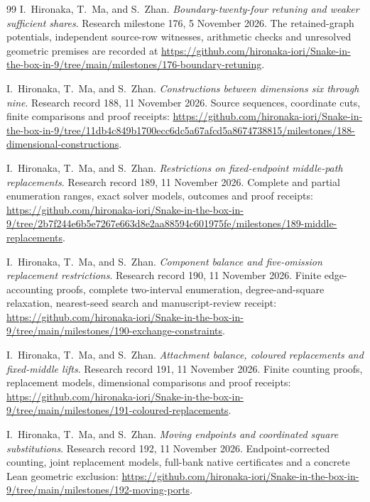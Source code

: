 \documentclass[11pt,a4paper]{article}
\theoremstyle{definition}
\theoremstyle{remark}
\begin{document}
\begin{thebibliography}{99}
I.~Hironaka, T.~Ma, and S.~Zhan. \emph{Boundary-twenty-four retuning and weaker sufficient shares}. Research milestone 176, 5 November 2026. The retained-graph potentials, independent source-row witnesses, arithmetic checks and unresolved geometric premises are recorded at
\url{https://github.com/hironaka-iori/Snake-in-the-box-in-9/tree/main/milestones/176-boundary-retuning}.


I.~Hironaka, T.~Ma, and S.~Zhan. \emph{Constructions between dimensions six through nine}. Research record 188, 11 November 2026. Source sequences, coordinate cuts, finite comparisons and proof receipts:
\url{https://github.com/hironaka-iori/Snake-in-the-box-in-9/tree/11db4c849b1700ecc6dc5a67afcd5a8674738815/milestones/188-dimensional-constructions}.

I.~Hironaka, T.~Ma, and S.~Zhan. \emph{Restrictions on fixed-endpoint middle-path replacements}. Research record 189, 11 November 2026. Complete and partial enumeration ranges, exact solver models, outcomes and proof receipts:
\url{https://github.com/hironaka-iori/Snake-in-the-box-in-9/tree/2b7f244e6b5e7267e663d8e2aa88594c601975fe/milestones/189-middle-replacements}.


I.~Hironaka, T.~Ma, and S.~Zhan. \emph{Component balance and five-omission replacement restrictions}. Research record 190, 11 November 2026. Finite edge-accounting proofs, complete two-interval enumeration, degree-and-square relaxation, nearest-seed search and manuscript-review receipt:
\url{https://github.com/hironaka-iori/Snake-in-the-box-in-9/tree/main/milestones/190-exchange-constraints}.

I.~Hironaka, T.~Ma, and S.~Zhan. \emph{Attachment balance, coloured replacements and fixed-middle lifts}. Research record 191, 11 November 2026. Finite counting proofs, replacement models, dimensional comparisons and proof receipts:
\url{https://github.com/hironaka-iori/Snake-in-the-box-in-9/tree/main/milestones/191-coloured-replacements}.

I.~Hironaka, T.~Ma, and S.~Zhan. \emph{Moving endpoints and coordinated square substitutions}. Research record 192, 11 November 2026. Endpoint-corrected counting, joint replacement models, full-bank native certificates and a concrete Lean geometric exclusion:
\url{https://github.com/hironaka-iori/Snake-in-the-box-in-9/tree/main/milestones/192-moving-ports}.


\end{thebibliography}
\end{document}
